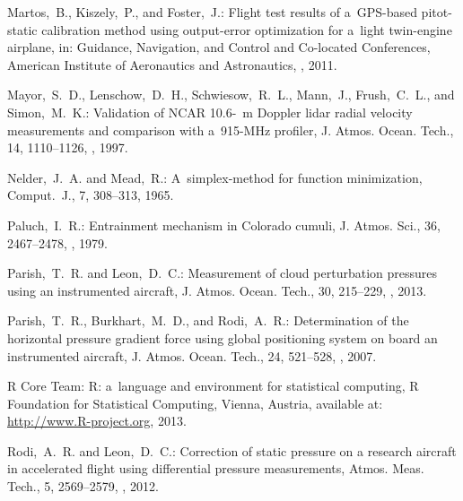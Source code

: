 \documentclass[amtd, online, hvmath]{copernicus}
\begin{document}
\begin{thebibliography}{30}
Martos,~B., Kiszely,~P., and Foster,~J.: {Flight test results of
  a~GPS-based pitot-static calibration method using output-error
  optimization for a~light twin-engine airplane}, in: {Guidance, Navigation, and
Control and Co-located Conferences}, American Institute of Aeronautics and Astronautics, , 2011.


Mayor,~S.~D., Lenschow,~D.~H., Schwiesow,~R.~L., Mann,~J., Frush,~C.~L., and Simon,~M.~K.:
{Validation of NCAR 10.6-\unit{{\mu}m}  Doppler lidar radial velocity measurements
and comparison with a~915-MHz profiler}, {J. Atmos. Ocean. Tech.}, {14}, {1110--1126}, , {1997}.


Nelder,~J.~A. and Mead,~R.: {A~simplex-method for function minimization}, {Comput.~J.}, {7}, {308--313}, {1965}.


Paluch,~I.~R.: {Entrainment mechanism in Colorado cumuli}, {J. Atmos. Sci.}, {36}, {2467--2478}, , {1979}.


Parish,~T.~R. and Leon,~D.~C.: {Measurement of cloud perturbation pressures using
an instrumented aircraft}, {J. Atmos. Ocean. Tech.}, {30}, {215--229}, , {2013}.


Parish,~T.~R., Burkhart,~M.~D., and Rodi,~A.~R.: {Determination of the horizontal
pressure gradient force using global positioning system on board an instrumented aircraft},
{J. Atmos. Ocean. Tech.}, {24}, {521--528}, , {2007}.


{{R Core Team}}: {R: a~language and environment for statistical
  computing}, R Foundation for Statistical Computing, Vienna, Austria,
available at: \url{http://www.R-project.org}, 2013.


 Rodi,~A.~R. and Leon,~D.~C.: Correction of static pressure on a
 research aircraft in accelerated flight using differential pressure
 measurements, Atmos. Meas. Tech., 5, 2569--2579,
 , 2012.



\end{thebibliography}
\end{document}

